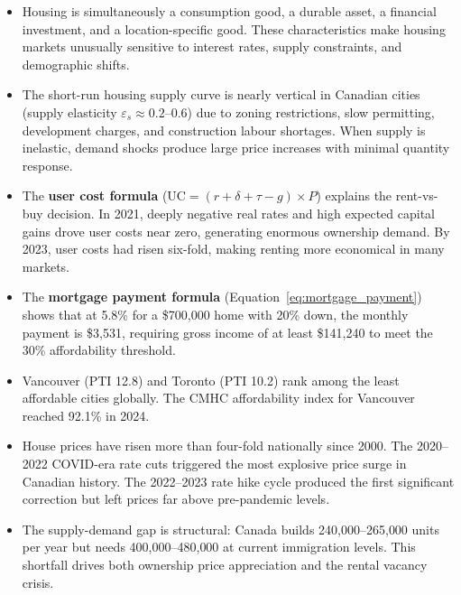 \begin{itemize}
  \item Housing is simultaneously a consumption good, a durable asset,
        a financial investment, and a location-specific good. These
        characteristics make housing markets unusually sensitive to
        interest rates, supply constraints, and demographic shifts.

  \item The short-run housing supply curve is nearly vertical in Canadian
        cities (supply elasticity $\varepsilon_s \approx 0.2$--$0.6$) due
        to zoning restrictions, slow permitting, development charges, and
        construction labour shortages. When supply is inelastic, demand
        shocks produce large price increases with minimal quantity response.

  \item The \textbf{user cost formula} ($\text{UC} = (r + \delta + \tau - g) \times P$)
        explains the rent-vs-buy decision. In 2021, deeply negative real
        rates and high expected capital gains drove user costs near zero,
        generating enormous ownership demand. By 2023, user costs had risen
        six-fold, making renting more economical in many markets.

  \item The \textbf{mortgage payment formula} (Equation~\ref{eq:mortgage_payment})
        shows that at 5.8\% for a \$700{,}000 home with 20\% down,
        the monthly payment is \$3{,}531, requiring gross income of at
        least \$141{,}240 to meet the 30\% affordability threshold.

  \item Vancouver (PTI 12.8) and Toronto (PTI 10.2) rank among the least
        affordable cities globally. The CMHC affordability index for
        Vancouver reached 92.1\% in 2024.

  \item House prices have risen more than four-fold nationally since 2000.
        The 2020--2022 COVID-era rate cuts triggered the most explosive
        price surge in Canadian history. The 2022--2023 rate hike cycle
        produced the first significant correction but left prices far
        above pre-pandemic levels.

  \item The supply-demand gap is structural: Canada builds 240{,}000--265{,}000
        units per year but needs 400{,}000--480{,}000 at current immigration
        levels. This shortfall drives both ownership price appreciation
        and the rental vacancy crisis.


\end{itemize}
